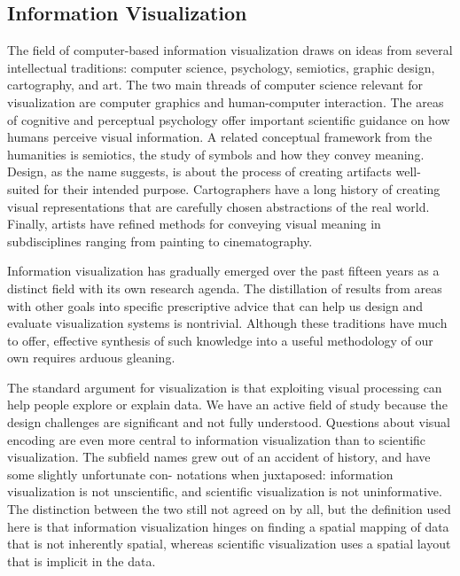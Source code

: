 \subsection{Information Visualization}
\label{sec:infovis}

The field of computer-based information visualization draws on ideas from several intellectual traditions: computer science, psychology, semiotics, graphic design, cartography, and art. The two main threads of computer science relevant for visualization are computer graphics and human-computer interaction. The areas of cognitive and perceptual psychology offer important scientific guidance on how humans perceive visual information. A related conceptual framework from the humanities is semiotics, the study of symbols and how they convey meaning. Design, as the name suggests, is about the process of creating artifacts well- suited for their intended purpose. Cartographers have a long history of creating visual representations that are carefully chosen abstractions of the real world. Finally, artists have refined methods for conveying visual meaning in subdisciplines ranging from painting to cinematography.

Information visualization has gradually emerged over the past fifteen years as a distinct field with its own research agenda. The distillation of results from areas with other goals into specific prescriptive advice that can help us design and evaluate visualization systems is nontrivial. Although these traditions have much to offer, effective synthesis of such knowledge into a useful methodology of our own requires arduous gleaning.

The standard argument for visualization is that exploiting visual processing can help people explore or explain data. We have an active field of study because the design challenges are significant and not fully understood. Questions about visual encoding are even more central to information visualization than to scientific visualization. The subfield names grew out of an accident of history, and have some slightly unfortunate con- notations when juxtaposed: information visualization is not unscientific, and scientific visualization is not uninformative. The distinction between the two still not agreed on by all, but the definition used here is that information visualization hinges on finding a spatial mapping of data that is not inherently spatial, whereas scientific visualization uses a spatial layout that is implicit in the data.

